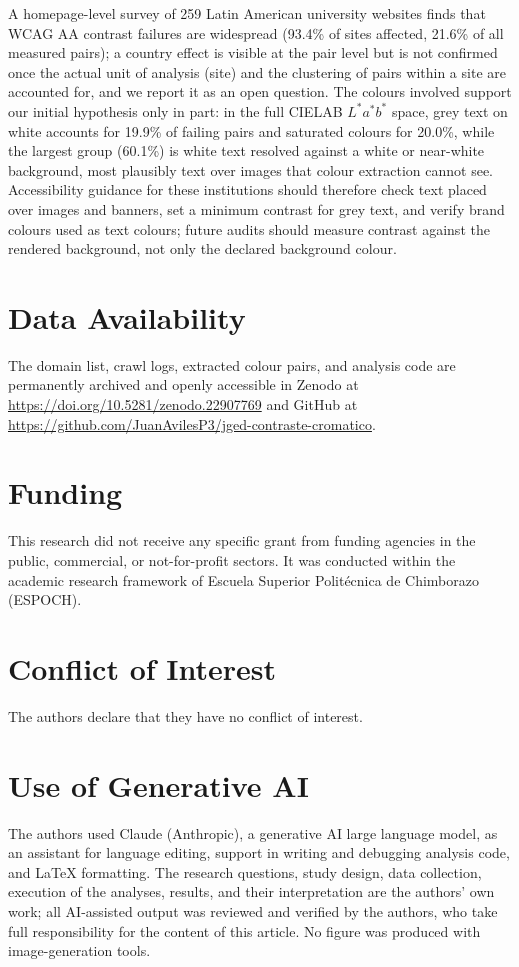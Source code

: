 \documentclass[10pt]{article}
\begin{document}
A homepage-level survey of 259 Latin American university websites finds that WCAG AA contrast failures are widespread (93.4\% of sites affected, 21.6\% of all measured pairs); a country effect is visible at the pair level but is not confirmed once the actual unit of analysis (site) and the clustering of pairs within a site are accounted for, and we report it as an open question. The colours involved support our initial hypothesis only in part: in the full CIELAB $L^*a^*b^*$ space, grey text on white accounts for 19.9\% of failing pairs and saturated colours for 20.0\%, while the largest group (60.1\%) is white text resolved against a white or near-white background, most plausibly text over images that colour extraction cannot see. Accessibility guidance for these institutions should therefore check text placed over images and banners, set a minimum contrast for grey text, and verify brand colours used as text colours; future audits should measure contrast against the rendered background, not only the declared background colour.

\section*{Data Availability}
The domain list, crawl logs, extracted colour pairs, and analysis code are permanently archived and openly accessible in Zenodo at \url{https://doi.org/10.5281/zenodo.22907769} and GitHub at \url{https://github.com/JuanAvilesP3/jged-contraste-cromatico}.

\section*{Funding}
This research did not receive any specific grant from funding agencies in the public, commercial, or not-for-profit sectors. It was conducted within the academic research framework of Escuela Superior Polit\'ecnica de Chimborazo (ESPOCH).

\section*{Conflict of Interest}
The authors declare that they have no conflict of interest.

\section*{Use of Generative AI}
The authors used Claude (Anthropic), a generative AI large language model, as an assistant for language editing, support in writing and debugging analysis code, and LaTeX formatting. The research questions, study design, data collection, execution of the analyses, results, and their interpretation are the authors' own work; all AI-assisted output was reviewed and verified by the authors, who take full responsibility for the content of this article. No figure was produced with image-generation tools.
\end{document}
